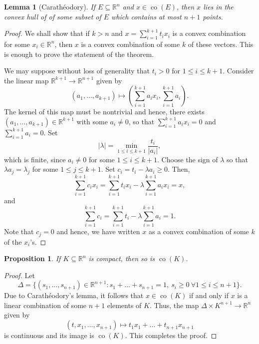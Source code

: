 \documentclass[12pt]{article}
\theoremstyle{thmstyle}
\newtheorem{lemma}[theorem]{Lemma}
\newtheorem{proposition}[theorem]{Proposition}
\theoremstyle{defstyle}
\newcommand{\R}{\mathbb{R}}
\renewcommand{\le}{\leqslant}
\renewcommand{\ge}{\geqslant}
\newcommand{\co}{\operatorname{co}}
\begin{document}
\begin{lemma}[Carath\'eodory]
    If $E\subseteq\R^n$ and $x\in\co(E)$, then $x$ lies in the convex hull of of some subset of $E$ which contains at most $n + 1$ points.
\end{lemma}
\begin{proof}
    We shall show that if $k > n$ and $x = \displaystyle\sum_{i = 1}^{k + 1}t_ix_i$ is a convex combination for some $x_i\in\R^n$, then $x$ is a convex combination of some $k$ of these vectors. This is enough to prove the statement of the theorem.

    We may suppose without loss of generality that $t_i > 0$ for $1\le i\le k + 1$. Consider the linear map $\R^{k + 1}\to\R^{n + 1}$ given by 
    \begin{equation*}
        (a_1,\dots, a_{k + 1})\mapsto\left(\sum_{i = 1}^{k + 1} a_ix_i, \sum_{i = 1}^{k + 1}a_i\right).
    \end{equation*}
    The kernel of this map must be nontrivial and hence, there exists $(a_1,\dots, a_{k + 1})\in\R^{k + 1}$ with some $a_i\ne 0$, so that $\sum_{i = 1}^{k + 1}a_ix_i = 0$ and $\sum_{i = 1}^{k + 1}a_i = 0$. Set
    \begin{equation*}
        |\lambda| = \min_{1\le i\le k + 1}\frac{t_i}{|a_i|},
    \end{equation*}
    which is finite, since $a_i\ne 0$ for some $1\le i\le k + 1$. Choose the sign of $\lambda$ so that $\lambda a_j = \lambda_j$ for some $1\le j\le k + 1$. Set $c_i = t_i - \lambda a_i\ge 0$. Then, 
    \begin{equation*}
        \sum_{i = 1}^{k + 1}c_ix_i = \sum_{i = 1}^{k + 1}t_ix_i - \lambda\sum_{i = 1}^{k + 1}a_ix_i = x,
    \end{equation*}
    and 
    \begin{equation*}
        \sum_{i = 1}^{k + 1} c_i = \sum_{i = 1}^{k + 1}t_i - \lambda\sum_{i = 1}^{k + 1}a_i = 1.
    \end{equation*}
    Note that $c_j = 0$ and hence, we have written $x$ as a convex combination of some $k$ of the $x_i$'s.
\end{proof}

\begin{proposition}
    If $K\subseteq\R^n$ is compact, then so is $\co(K)$.
\end{proposition}
\begin{proof}
    Let 
    \begin{equation*}
        \Delta = \{(s_1,\dots, s_{n + 1})\in\R^{n + 1}\colon s_1 + \dots + s_{n + 1} = 1,~s_i\ge 0~\forall 1\le i\le n + 1\}.
    \end{equation*}
    Due to Carath\'eodory's lemma, it follows that $x\in\co(K)$ if and only if $x$ is a linear combination of some $n + 1$ elements of $K$. Thus, the map $\Delta\times K^{n + 1}\to \R^{n}$ given by 
    \begin{equation*}
        (t, x_1,\dots, x_{n + 1})\mapsto t_1x_1 + \dots + t_{n + 1}x_{n + 1}
    \end{equation*}
    is continuous and its image is $\co(K)$. This completes the proof.
\end{proof}
\end{document}

